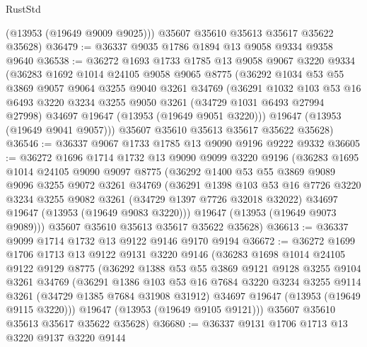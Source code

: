 \begin{lexlean}{RustStd}
\begin{coremodule}
        (@13953 (@19649 @9009 @9025)))
      @35607
      @35610
      @35613
      @35617
      @35622
      @35628)
@36479 := @36337 @9035 @1786 @1894 @13 @9058 @9334 @9358 @9640
@36538 := @36272
    @1693
    @1733
    @1785
    @13
    @9058
    @9067
    @3220
    @9334
    (@36283
      @1692
      @1014
      @24105
      @9058
      @9065
      @8775
      (@36292
        @1034
        @53
        @55
        @3869
        @9057
        @9064
        @3255
        @9040
        @3261
        @34769
        (@36291
          @1032
          @103
          @53
          @16
          @6493
          @3220
          @3234
          @3255
          @9050
          @3261
          (@34729 @1031 @6493 @27994 @27998)
          @34697
          @19647
          (@13953 (@19649 @9051 @3220)))
        @19647
        (@13953 (@19649 @9041 @9057)))
      @35607
      @35610
      @35613
      @35617
      @35622
      @35628)
@36546 := @36337 @9067 @1733 @1785 @13 @9090 @9196 @9222 @9332
@36605 := @36272
    @1696
    @1714
    @1732
    @13
    @9090
    @9099
    @3220
    @9196
    (@36283
      @1695
      @1014
      @24105
      @9090
      @9097
      @8775
      (@36292
        @1400
        @53
        @55
        @3869
        @9089
        @9096
        @3255
        @9072
        @3261
        @34769
        (@36291
          @1398
          @103
          @53
          @16
          @7726
          @3220
          @3234
          @3255
          @9082
          @3261
          (@34729 @1397 @7726 @32018 @32022)
          @34697
          @19647
          (@13953 (@19649 @9083 @3220)))
        @19647
        (@13953 (@19649 @9073 @9089)))
      @35607
      @35610
      @35613
      @35617
      @35622
      @35628)
@36613 := @36337 @9099 @1714 @1732 @13 @9122 @9146 @9170 @9194
@36672 := @36272
    @1699
    @1706
    @1713
    @13
    @9122
    @9131
    @3220
    @9146
    (@36283
      @1698
      @1014
      @24105
      @9122
      @9129
      @8775
      (@36292
        @1388
        @53
        @55
        @3869
        @9121
        @9128
        @3255
        @9104
        @3261
        @34769
        (@36291
          @1386
          @103
          @53
          @16
          @7684
          @3220
          @3234
          @3255
          @9114
          @3261
          (@34729 @1385 @7684 @31908 @31912)
          @34697
          @19647
          (@13953 (@19649 @9115 @3220)))
        @19647
        (@13953 (@19649 @9105 @9121)))
      @35607
      @35610
      @35613
      @35617
      @35622
      @35628)
@36680 := @36337 @9131 @1706 @1713 @13 @3220 @9137 @3220 @9144

\end{coremodule}
\end{lexlean}
